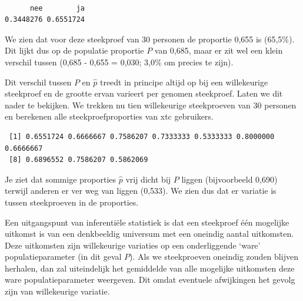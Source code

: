 \documentclass[
  letterpaper,
  DIV=11,
  numbers=noendperiod]{scrreprt}
\newenvironment{Shaded}{\begin{snugshade}}{\end{snugshade}}
\newcommand{\AttributeTok}[1]{\textcolor[rgb]{0.40,0.45,0.13}{#1}}
\newcommand{\CommentTok}[1]{\textcolor[rgb]{0.37,0.37,0.37}{#1}}
\newcommand{\ConstantTok}[1]{\textcolor[rgb]{0.56,0.35,0.01}{#1}}
\newcommand{\DecValTok}[1]{\textcolor[rgb]{0.68,0.00,0.00}{#1}}
\newcommand{\FunctionTok}[1]{\textcolor[rgb]{0.28,0.35,0.67}{#1}}
\newcommand{\NormalTok}[1]{\textcolor[rgb]{0.00,0.23,0.31}{#1}}
\newcommand{\OtherTok}[1]{\textcolor[rgb]{0.00,0.23,0.31}{#1}}
\newcommand{\SpecialCharTok}[1]{\textcolor[rgb]{0.37,0.37,0.37}{#1}}
\newcommand{\StringTok}[1]{\textcolor[rgb]{0.13,0.47,0.30}{#1}}
\begin{document}
\begin{verbatim}

      nee        ja 
0.3448276 0.6551724 
\end{verbatim}

We zien dat voor deze steekproef van 30 personen de proportie 0,655 is
(65,5\%). Dit lijkt dus op de populatie proportie \(P\) van 0,685, maar
er zit wel een klein verschil tussen (0,685 - 0,655 = 0,030; 3,0\% om
precies te zijn).

Dit verschil tussen \(P\) en \(\hat{p}\) treedt in principe altijd op
bij een willekeurige steekproef en de grootte ervan varieert per genomen
steekproef. Laten we dit nader te bekijken. We trekken nu tien
willekeurige steekproeven van 30 personen en berekenen alle
steekproefproporties van xtc gebruikers.

\begin{Shaded}
\end{Shaded}

\begin{verbatim}
 [1] 0.6551724 0.6666667 0.7586207 0.7333333 0.5333333 0.8000000 0.6666667
 [8] 0.6896552 0.7586207 0.5862069
\end{verbatim}

Je ziet dat sommige proporties \(\hat{p}\) vrij dicht bij \(P\) liggen
(bijvoorbeeld 0,690) terwijl anderen er ver weg van liggen (0,533). We
zien dus dat er variatie is tussen steekproeven in de proporties.

Een uitgangspunt van inferentiële statistiek is dat een steekproef één
mogelijke uitkomst is van een denkbeeldig universum met een oneindig
aantal uitkomsten. Deze uitkomsten zijn willekeurige variaties op een
onderliggende `ware' populatieparameter (in dit geval \(P\)). Als we
steekproeven oneindig zouden blijven herhalen, dan zal uiteindelijk het
gemiddelde van alle mogelijke uitkomsten deze ware populatieparameter
weergeven. Dit omdat eventuele afwijkingen het gevolg zijn van
willekeurige variatie.
\end{document}
